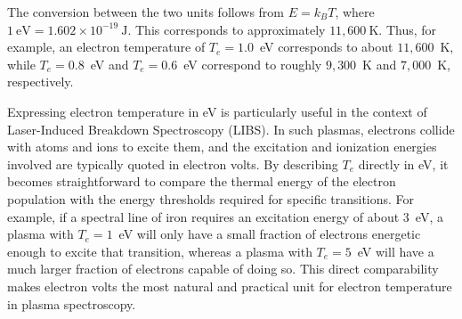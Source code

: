 \documentclass[12pt,a4paper]{article}
\begin{document}
	The conversion between the two units follows from $E = k_B T$, where $1~\text{eV} = 1.602 \times 10^{-19}~\text{J}$. This corresponds to approximately $11{,}600~\text{K}$. Thus, for example, an electron temperature of $T_e = 1.0$~eV corresponds to about $11{,}600$~K, while $T_e = 0.8$~eV and $T_e = 0.6$~eV correspond to roughly $9{,}300$~K and $7{,}000$~K, respectively.  
	
	Expressing electron temperature in eV is particularly useful in the context of Laser-Induced Breakdown Spectroscopy (LIBS). In such plasmas, electrons collide with atoms and ions to excite them, and the excitation and ionization energies involved are typically quoted in electron volts. By describing $T_e$ directly in eV, it becomes straightforward to compare the thermal energy of the electron population with the energy thresholds required for specific transitions. For example, if a spectral line of iron requires an excitation energy of about 3~eV, a plasma with $T_e = 1$~eV will only have a small fraction of electrons energetic enough to excite that transition, whereas a plasma with $T_e = 5$~eV will have a much larger fraction of electrons capable of doing so. This direct comparability makes electron volts the most natural and practical unit for electron temperature in plasma spectroscopy.
	
	\newpage
	
	

	
\end{document}
